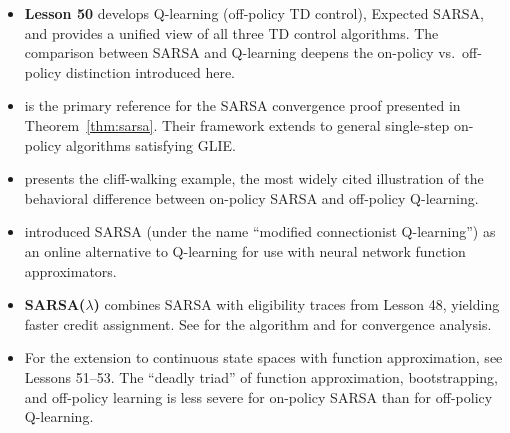 \documentclass[11pt,a4paper]{article}
\begin{document}
\begin{itemize}
  \item \textbf{Lesson 50} develops Q-learning (off-policy TD
    control), Expected SARSA, and provides a unified view of all
    three TD control algorithms. The comparison between SARSA and
    Q-learning deepens the on-policy vs.\ off-policy distinction
    introduced here.

  \item \citet{singh2000} is the primary reference for the SARSA
    convergence proof presented in Theorem~\ref{thm:sarsa}. Their
    framework extends to general single-step on-policy algorithms
    satisfying GLIE.

  \item \citet[Section 6.5]{suttonbarto2018} presents the
    cliff-walking example, the most widely cited illustration of
    the behavioral difference between on-policy SARSA and off-policy
    Q-learning.

  \item \citet{rummery1994} introduced SARSA (under the name
    ``modified connectionist Q-learning'') as an online alternative
    to Q-learning for use with neural network function approximators.

  \item \textbf{SARSA($\lambda$)} combines SARSA with eligibility
    traces from Lesson 48, yielding faster credit assignment. See
    \citet[Chapter 12]{suttonbarto2018} for the algorithm and
    \citet[Chapter 5]{bertsekas1996} for convergence analysis.

  \item For the extension to continuous state spaces with function
    approximation, see Lessons 51--53. The ``deadly triad'' of
    function approximation, bootstrapping, and off-policy learning
    is less severe for on-policy SARSA than for off-policy
    Q-learning.
\end{itemize}


\end{document}
